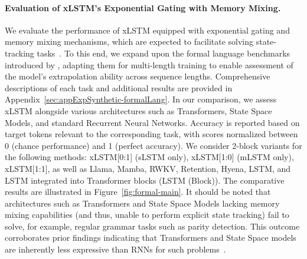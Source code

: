 \paragraph{Evaluation of xLSTM's Exponential Gating with Memory Mixing.} We evaluate the performance of xLSTM equipped with exponential gating and memory mixing mechanisms, which are expected to facilitate solving state-tracking tasks~\citep{Merrill:24, Merrill:23}. To this end, we expand upon the formal language benchmarks introduced by \citet{Deletang:23}, adapting them for multi-length training to enable assessment of the model's extrapolation ability across sequence lengths. Comprehensive descriptions of each task and additional results are provided in Appendix~\ref{sec:appExpSynthetic-formalLang}. In our comparison, we assess xLSTM alongside various architectures such as Transformers, State Space Models, and standard Recurrent Neural Networks. Accuracy is reported based on target tokens relevant to the corresponding task, with scores normalized between 0 (chance performance) and 1 (perfect accuracy). We consider 2-block variants for the following methods: xLSTM[0:1] (sLSTM only), xLSTM[1:0] (mLSTM only), xLSTM[1:1], as well as Llama, Mamba, RWKV, Retention, Hyena, LSTM, and LSTM integrated into Transformer blocks (LSTM (Block)). The comparative results are illustrated in Figure~\ref{fig:formal-main}. It should be noted that architectures such as Transformers and State Space Models lacking memory mixing capabilities (and thus, unable to perform explicit state tracking) fail to solve, for example, regular grammar tasks such as parity detection. This outcome corroborates prior findings indicating that Transformers and State Space models are inherently less expressive than RNNs for such problems~\citep{Merrill:24, Merrill:23, Deletang:23}.

